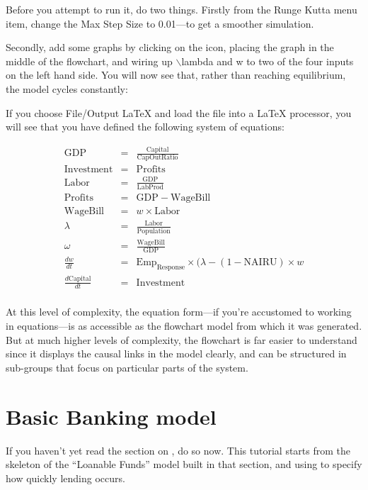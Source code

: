 Before you attempt to run it, do two things. Firstly from the Runge
Kutta menu item, change the Max Step Size to 0.01---to get a smoother
simulation. 


Secondly, add some graphs by clicking on the
 icon, placing the graph
in the middle of the flowchart, and wiring up $\backslash$lambda and w to two of
the four inputs on the left hand side. You will now see that, rather
than reaching equilibrium, the model cycles constantly:


If you choose File/Output LaTeX and load the file into a LaTeX
processor, you will see that you have defined the following system of
equations:

\begin{eqnarray*}
\mathrm{GDP}&=&\frac{\mathrm{Capital}}{\mathrm{CapOutRatio}}\\
\mathrm{Investment}&=&\mathrm{Profits}\\
\mathrm{Labor}&=&\frac{\mathrm{GDP}}{\mathrm{LabProd}}\\
\mathrm{Profits}&=&\mathrm{GDP}-\mathrm{WageBill}\\
\mathrm{WageBill}&=&w\times\mathrm{Labor}\\
\lambda&=&\frac{\mathrm{Labor}}{\mathrm{Population}}\\
\omega&=&\frac{\mathrm{WageBill}}{\mathrm{GDP}}\\
\frac{dw}{dt}&=&\mathrm{Emp}_\mathrm{Response}\times(\lambda-(1-\mathrm{NAIRU})
        \times w\\
\frac{d\mathrm{Capital}}{dt}&=&\mathrm{Investment}\\
\end{eqnarray*}


At this level of complexity, the equation form---if you're accustomed
to working in equations---is as accessible as the flowchart model from
which it was generated. But at much higher levels of complexity, the
flowchart is far easier to understand since it displays the causal
links in the model clearly, and can be structured in sub-groups that
focus on particular parts of the system. 

\section{Basic Banking model}\label{tut:basicBankModel}

If you haven't yet read the section on , do so now. This tutorial starts from the
skeleton of the ``Loanable Funds'' model built in that section, and
using  to specify how quickly
lending occurs.  


